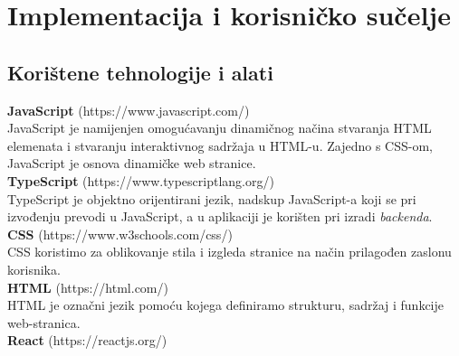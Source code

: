 \chapter{Implementacija i korisničko sučelje}
		
		
		\section{Korištene tehnologije i alati}
		
			{\hspace{7mm}\textbf{JavaScript} (https://www.javascript.com/)}\\
			
	{JavaScript je namijenjen omogućavanju dinamičnog načina stvaranja HTML elemenata i stvaranju interaktivnog sadržaja u HTML-u. Zajedno s CSS-om, JavaScript je osnova dinamičke web stranice.}\\

			{\textbf{TypeScript} (https://www.typescriptlang.org/)}\\
			
	{TypeScript je objektno orijentirani jezik, nadskup JavaScript-a koji se pri izvođenju prevodi u JavaScript, a u aplikaciji je korišten pri izradi \textit{backenda}.}\\

			{\textbf{CSS} (https://www.w3schools.com/css/)}\\
	
	{CSS koristimo za oblikovanje stila i izgleda stranice na način prilagođen zaslonu korisnika.}\\

			{\textbf{HTML} (https://html.com/)}\\
	
	{HTML je označni jezik pomoću kojega definiramo strukturu, sadržaj i funkcije web-stranica.}\\
	
			{\textbf{React} (https://reactjs.org/)}\\

